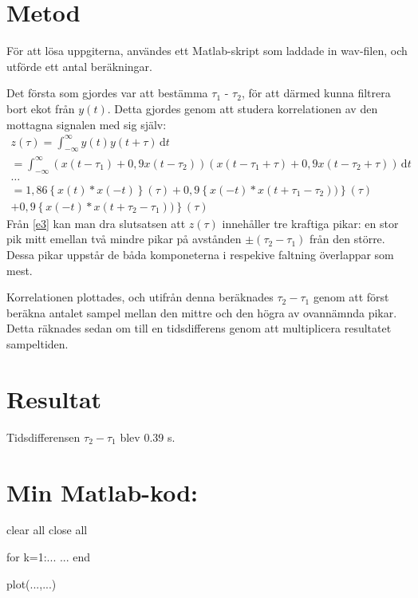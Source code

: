 \documentclass[10pt,twocolumn]{article}
\begin{document}
\section{Metod}
För att lösa uppgiterna, användes ett Matlab-skript som laddade in wav-filen,
och utförde ett antal beräkningar.

Det första som gjordes var att bestämma $\tau_1$ - $\tau_2$, för att därmed
kunna filtrera bort ekot från $y(t)$. Detta gjordes genom att studera korrelationen
av den mottagna signalen med sig själv:
\begin{multline}
    z(\tau) = \int_{-\infty}^{\infty}\!y(t)y(t+\tau)\, \mathrm{d}t \\  
    = \int_{-\infty}^{\infty}\!(x(t-\tau_1)+0,9 x(t-\tau_2))(x(t-\tau_1+\tau)+0,9 x(t-\tau_2+\tau))\, \mathrm{d}t \\
    \ldots \\
    = 1,86\left\{x(t) \ast x(-t)\right\}(\tau) + 
    0,9\left\{x(-t) \ast x(t+\tau_1-\tau_2))\right\}(\tau)\\ + 
    0,9\left\{x(-t) \ast x(t+\tau_2-\tau_1))\right\}(\tau)
    \label{e3}
\end{multline}
Från \ref{e3} kan man dra slutsatsen att $z(\tau)$ innehåller tre kraftiga pikar: en stor pik mitt emellan två mindre
pikar på avstånden $\pm(\tau_2 - \tau_1)$ från den större. Dessa pikar uppstår de båda komponeterna i respekive faltning
överlappar som mest.

Korrelationen plottades, och utifrån denna beräknades $\tau_2 - \tau_1$ genom att först beräkna antalet sampel mellan
den mittre och den högra av ovannämnda pikar. Detta räknades sedan om till en tidsdifferens genom att multiplicera resultatet
sampeltiden.


\section{Resultat}

Tidsdifferensen $\tau_2 - \tau_1$ blev 0.39 s.

\clearpage

\section*{Min Matlab-kod:}
\begin{spverbatim}
clear all
close all

for k=1:...
  ...
end

plot(...,...)
\end{spverbatim}
\end{document}
